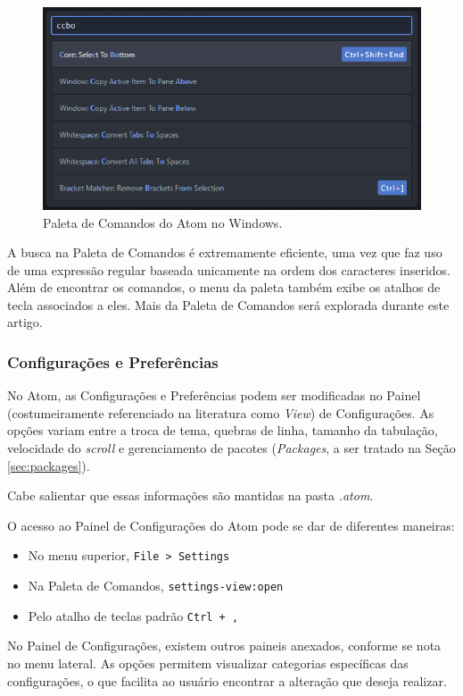 	\begin{figure}[h]
		\centering
		\label{fig:paleta}
		\includegraphics[scale = 0.7]{paleta}
		\caption{Paleta de Comandos do Atom no Windows.}
	\end{figure}

	A busca na Paleta de Comandos é extremamente eficiente, uma vez que faz uso de uma expressão regular baseada unicamente na ordem dos caracteres inseridos. Além de encontrar os comandos, o menu da paleta também exibe os atalhos de tecla associados a eles. Mais da Paleta de Comandos será explorada durante este artigo.

	\subsubsection{Configurações e Preferências}\label{sec:settings}
	No Atom, as Configurações e Preferências podem ser modificadas no Painel (costumeiramente referenciado na literatura como \textit{View}) de Configurações. As opções variam entre a troca de tema, quebras de linha, tamanho da tabulação, velocidade do \textit{scroll} e gerenciamento de pacotes (\textit{Packages}, a ser tratado na Seção \ref{sec:packages}).

	Cabe salientar que essas informações são mantidas na pasta \textit{.atom}.

	O acesso ao Painel de Configurações do Atom pode se dar de diferentes maneiras:
	\begin{itemize}
		\item No menu superior, \verb|File > Settings|
		\item Na Paleta de Comandos, \verb|settings-view:open|
		\item Pelo atalho de teclas padrão \verb|Ctrl + ,|
	\end{itemize}

	No Painel de Configurações, existem outros paineis anexados, conforme se nota no menu lateral. As opções permitem visualizar categorias específicas das configurações, o que facilita ao usuário encontrar a alteração que deseja realizar.

